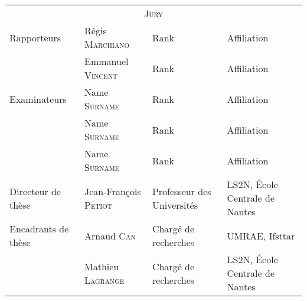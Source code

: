 \begin{cover}
  \noindent
  \begin{tabular}{llll} %
    \multicolumn{4}{c}{\scshape\color{teal}\Large Jury} \\[10pt]
    Rapporteurs & Régis \textsc{Marchiano} & Rank & Affiliation\\
                & Emmanuel \textsc{Vincent} & Rank & Affiliation \\[10pt]
    Examinateurs & Name \textsc{Surname} & Rank & Affiliation
    \\
                & Name \textsc{Surname} & Rank & Affiliation \\
                & Name \textsc{Surname} & Rank & Affiliation \\[10pt]
    Directeur de thèse & Jean-François \textsc{Petiot} & Professeur des Universités & LS2N, École Centrale de Nantes \\
    Encadrants de thèse & Arnaud \textsc{Can} & Chargé de recherches & UMRAE, Ifsttar \\
     & Mathieu \textsc{Lagrange} & Chargé de recherches & LS2N, École Centrale de Nantes 
  \end{tabular}
\end{cover}